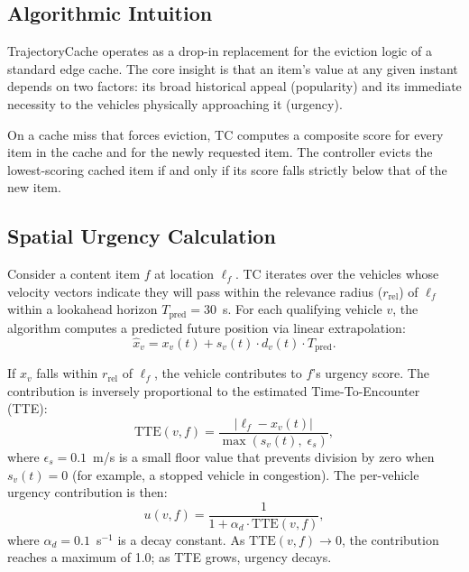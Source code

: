 \documentclass[preprint,12pt]{elsarticle}
\begin{document}
	\subsection{Algorithmic Intuition}
	
	TrajectoryCache operates as a drop-in replacement for the eviction logic of a standard edge cache. The core insight is that an item's value at any given instant depends on two factors: its broad historical appeal (popularity) and its immediate necessity to the vehicles physically approaching it (urgency).
	
	On a cache miss that forces eviction, TC computes a composite score for every item in the cache and for the newly requested item. The controller evicts the lowest-scoring cached item if and only if its score falls strictly below that of the new item.
	
	\subsection{Spatial Urgency Calculation}
	
	Consider a content item $f$ at location $\ell_f$. TC iterates over the vehicles whose velocity vectors indicate they will pass within the relevance radius ($r_\text{rel}$) of $\ell_f$ within a lookahead horizon $T_\text{pred} = 30$~s. For each qualifying vehicle $v$, the algorithm computes a predicted future position via linear extrapolation:
	\begin{equation}
		\hat{x}_v = x_v(t) + s_v(t) \cdot d_v(t) \cdot T_\text{pred}.
		\label{eq:predict_method}
	\end{equation}
	
	If $\hat{x}_v$ falls within $r_\text{rel}$ of $\ell_f$, the vehicle contributes to $f$'s urgency score. The contribution is inversely proportional to the estimated Time-To-Encounter (TTE):
	\begin{equation}
		\text{TTE}(v, f) = \frac{|\ell_f - x_v(t)|}{\max(s_v(t),\; \epsilon_s)},
		\label{eq:tte_method}
	\end{equation}
	where $\epsilon_s = 0.1$~m/s is a small floor value that prevents division by zero when $s_v(t) = 0$ (for example, a stopped vehicle in congestion). The per-vehicle urgency contribution is then:
	\begin{equation}
		u(v, f) = \frac{1}{1 + \alpha_d \cdot \text{TTE}(v, f)},
		\label{eq:urgency_contrib_method}
	\end{equation}
	where $\alpha_d = 0.1$~s$^{-1}$ is a decay constant. As $\text{TTE}(v,f) \rightarrow 0$, the contribution reaches a maximum of 1.0; as TTE grows, urgency decays.
	
\end{document}
